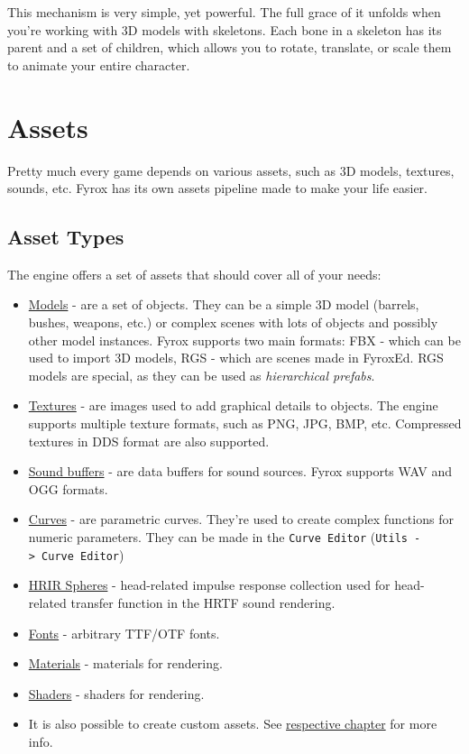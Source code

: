 \documentclass[
]{book}
\providecommand{\tightlist}{%
  \setlength{\itemsep}{0pt}\setlength{\parskip}{0pt}}
\theoremstyle{definition}
\theoremstyle{definition}
\theoremstyle{definition}
\theoremstyle{definition}
\theoremstyle{remark}
\begin{document}
This mechanism is very simple, yet powerful. The full grace of it unfolds when you're working with 3D models with skeletons. Each bone in a skeleton has its parent and a set of children, which allows you to rotate, translate, or scale them to animate your entire character.

\section{Assets}\label{assets}

Pretty much every game depends on various assets, such as 3D models, textures, sounds, etc. Fyrox has its own assets pipeline made to make your life easier.

\subsection{Asset Types}\label{asset-types}

The engine offers a set of assets that should cover all of your needs:

\begin{itemize}
\tightlist
\item
  \href{../resources/model.md}{Models} - are a set of objects. They can be a simple 3D model (barrels, bushes, weapons,
  etc.) or complex scenes with lots of objects and possibly other model instances. Fyrox supports two main formats:
  FBX - which can be used to import 3D models, RGS - which are scenes made in FyroxEd. RGS models are special, as they can be
  used as \emph{hierarchical prefabs}.
\item
  \href{../resources/texture.md}{Textures} - are images used to add graphical details to objects. The
  engine supports multiple texture formats, such as PNG, JPG, BMP, etc. Compressed textures in DDS format are also supported.
\item
  \href{../resources/sound.md}{Sound buffers} - are data buffers for sound sources. Fyrox supports WAV and OGG formats.
\item
  \href{../resources/curve.md}{Curves} - are parametric curves. They're used to create complex functions for numeric parameters.
  They can be made in the \texttt{Curve\ Editor} (\texttt{Utils\ -\textgreater{}\ Curve\ Editor})
\item
  \href{../sound/hrtf.md}{HRIR Spheres} - head-related impulse response collection used for head-related transfer function
  in the HRTF sound rendering.
\item
  \href{../ui/font.md}{Fonts} - arbitrary TTF/OTF fonts.
\item
  \href{../rendering/materials.md}{Materials} - materials for rendering.
\item
  \href{../rendering/shaders.md}{Shaders} - shaders for rendering.
\item
  It is also possible to create custom assets. See \href{../resources/custom.md}{respective chapter} for more info.
\end{itemize}
\end{document}
